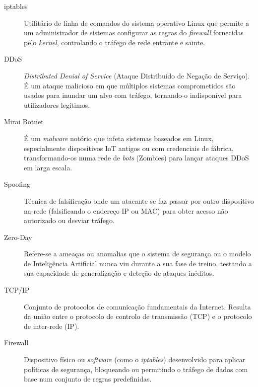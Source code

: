 \begin{description}
    \item[iptables] Utilitário de linha de comandos do sistema operativo Linux que permite a um administrador de sistemas configurar as regras do \textit{firewall} fornecidas pelo \textit{kernel}, controlando o tráfego de rede entrante e sainte.

    \item[DDoS] \textit{Distributed Denial of Service} (Ataque Distribuído de Negação de Serviço). É um ataque malicioso em que múltiplos sistemas comprometidos são usados para inundar um alvo com tráfego, tornando-o indisponível para utilizadores legítimos.

    \item[Mirai Botnet] É um \textit{malware} notório que infeta sistemas baseados em Linux, especialmente dispositivos IoT antigos ou com credenciais de fábrica, transformando-os numa rede de \textit{bots} (Zombies) para lançar ataques DDoS em larga escala.

    \item[Spoofing] Técnica de falsificação onde um atacante se faz passar por outro dispositivo na rede (falsificando o endereço IP ou MAC) para obter acesso não autorizado ou desviar tráfego.

    \item[Zero-Day] Refere-se a ameaças ou anomalias que o sistema de segurança ou o modelo de Inteligência Artificial nunca viu durante a sua fase de treino, testando a sua capacidade de generalização e deteção de ataques inéditos.

    \item[TCP/IP] Conjunto de protocolos de comunicação fundamentais da Internet. Resulta da união entre o protocolo de controlo de transmissão (TCP) e o protocolo de inter-rede (IP).

    \item[Firewall] Dispositivo físico ou \textit{software} (como o \textit{iptables}) desenvolvido para aplicar políticas de segurança, bloqueando ou permitindo o tráfego de dados com base num conjunto de regras predefinidas.

\end{description}